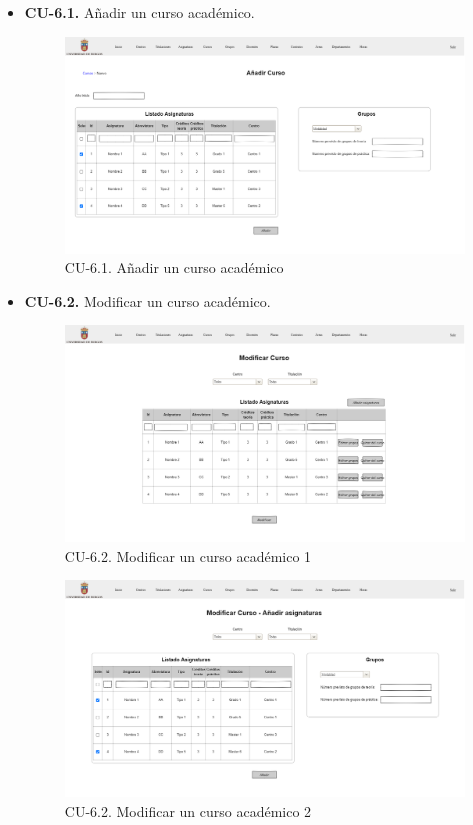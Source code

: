 \begin{itemize}
	\item \textbf{CU-6.1.} Añadir un curso académico.
	\begin{figure}[!h]
		\centering
		\includegraphics[width=\textwidth]{../img/Anexos/Vistas/add_curso.png}
		\caption{CU-6.1. Añadir un curso académico}\label{fig:../img/Anexos/Vistas/add_curso.png}
	\end{figure}
	
	\item \textbf{CU-6.2.} Modificar un curso académico.
	\begin{figure}[!h]
		\centering
		\includegraphics[width=\textwidth]{../img/Anexos/Vistas/mod_curso_1.png}
		\caption{CU-6.2. Modificar un curso académico 1}\label{fig:../img/Anexos/Vistas/mod_curso_1.png}
	\end{figure}
		
	\begin{figure}[!h]
		\centering
		\includegraphics[width=\textwidth]{../img/Anexos/Vistas/mod_curso_2.png}
		\caption{CU-6.2. Modificar un curso académico 2}\label{fig:../img/Anexos/Vistas/mod_curso_2.png}
	\end{figure}
	

\end{itemize}
